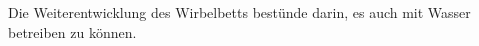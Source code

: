 Die Weiterentwicklung des Wirbelbetts bestünde darin, es auch mit Wasser betreiben zu können.











{}

\listoffigures







